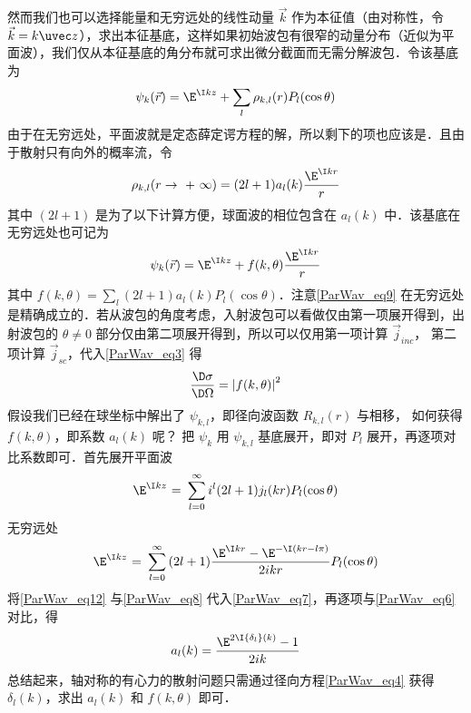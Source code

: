 然而我们也可以选择能量和无穷远处的线性动量 $\vec k$ 作为本征值（由对称性，令 $\vec k=k\uvec z$），求出本征基底，这样如果初始波包有很窄的动量分布（近似为平面波），我们仅从本征基底的角分布就可求出微分截面而无需分解波包．令该基底为
\begin{equation}\label{ParWav_eq7}
{\psi_k}(\vec r) = {\E^{\I kz}} + \sum\limits_l {{\rho_{k,l}}(r){P_l}(\cos \theta )} 
\end{equation}
由于在无穷远处，平面波就是定态薛定谔方程的解，所以剩下的项也应该是．且由于散射只有向外的概率流，令
\begin{equation}\label{ParWav_eq8}
{\rho_{k,l}}(r \to {\text{ + }}\infty ) = (2l + 1){a_l}(k)\frac{\E^{\I kr}}{r}
\end{equation}
其中 $(2l + 1)$ 是为了以下计算方便，球面波的相位包含在 ${a_l}(k)$ 中．该基底在无穷远处也可记为
\begin{equation}\label{ParWav_eq9}
{\psi_k}(\vec r) = {\E^{\I kz}} + f(k,\theta )\frac{\E^{\I kr}}{r}
\end{equation}
其中 $f(k,\theta ) = \sum\limits_l {(2l + 1){a_l}(k){P_l}(\cos \theta )}$．注意\autoref{ParWav_eq9} 在无穷远处是精确成立的．若从波包的角度考虑，入射波包可以看做仅由第一项展开得到，出射波包的 $\theta  \ne 0$ 部分仅由第二项展开得到，所以可以仅用第一项计算 ${\vec j_{inc}}$， 第二项计算 ${\vec j_{sc}}$，代入\autoref{ParWav_eq3} 得
\begin{equation}
\frac{\D \sigma }{\D \Omega } = {\left| {f(k,\theta )} \right|^2}
\end{equation}
假设我们已经在球坐标中解出了 ${\psi_{k,l}}$，即径向波函数 ${R_{k,l}}(r)$ 与相移， 如何获得 $f(k,\theta )$，即系数 ${a_l}(k)$ 呢？ 把 ${\psi_k}$ 用 $\psi_{k,l}$ 基底展开，即对 ${P_l}$ 展开，再逐项对比系数即可．首先展开平面波
\begin{equation}
{\E^{\I kz}}{\text{ = }}\sum\limits_{l = 0}^\infty  {{i^l}(2l + 1){j_l}(kr){P_l}(\cos \theta )} 
\end{equation}
无穷远处
\begin{equation}\label{ParWav_eq12}
{\E^{\I kz}}{\text{ = }}\sum\limits_{l = 0}^\infty  {(2l + 1)\frac{{\E^{\I kr}} - {\E^{ - \I(kr - l\pi )}}}{2ikr}{P_l}(\cos \theta )} 
\end{equation}
将\autoref{ParWav_eq12} 与\autoref{ParWav_eq8} 代入\autoref{ParWav_eq7}，再逐项与\autoref{ParWav_eq6} 对比，得
\begin{equation}
{a_l}(k) = \frac{{\E^{2\I {\delta_l}(k)}} - 1}{2ik}
\end{equation}
总结起来，轴对称的有心力的散射问题只需通过径向方程\autoref{ParWav_eq4} 获得 ${\delta_l}(k)$，求出 ${a_l}(k)$ 和 $f(k,\theta )$ 即可．


